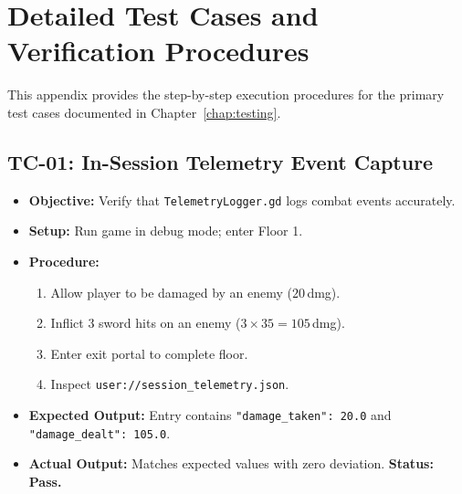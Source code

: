 \chapter{Detailed Test Cases and Verification Procedures}
\label{app:test_cases}

This appendix provides the step-by-step execution procedures for the primary test cases documented in Chapter~\ref{chap:testing}.

\section{TC-01: In-Session Telemetry Event Capture}
\begin{itemize}
    \item \textbf{Objective:} Verify that \texttt{TelemetryLogger.gd} logs combat events accurately.
    \item \textbf{Setup:} Run game in debug mode; enter Floor 1.
    \item \textbf{Procedure:}
    \begin{enumerate}
        \item Allow player to be damaged by an enemy ($20$\,dmg).
        \item Inflict 3 sword hits on an enemy ($3 \times 35 = 105$\,dmg).
        \item Enter exit portal to complete floor.
        \item Inspect \texttt{user://session\_telemetry.json}.
    \end{enumerate}
    \item \textbf{Expected Output:} Entry contains \texttt{"damage\_taken": 20.0} and \texttt{"damage\_dealt": 105.0}.
    \item \textbf{Actual Output:} Matches expected values with zero deviation. \textbf{Status: Pass.}
\end{itemize}

